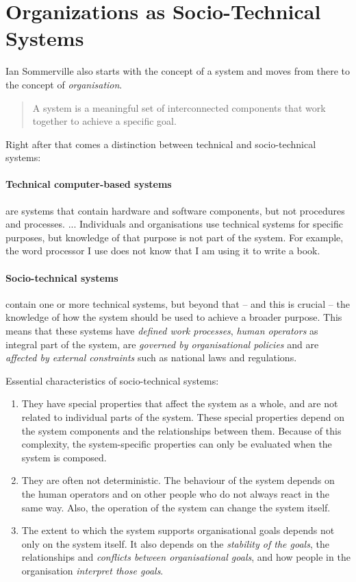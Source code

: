 \documentclass[11pt,a4paper]{article}
\begin{document}
\section{Organizations as Socio-Technical Systems}

Ian Sommerville \cite{Sommerville2015} also starts with the concept of a
system and moves from there to the concept of \emph{organisation}.
\begin{quote}
  A system is a meaningful set of interconnected components that work together
  to achieve a specific goal.  \cite{Sommerville2015}
\end{quote}
Right after that comes a distinction between technical and socio-technical
systems:

\paragraph{Technical computer-based systems}
are systems that contain hardware and software components, but not procedures
and processes. ... Individuals and organisations use technical systems for
specific purposes, but knowledge of that purpose is not part of the system.
For example, the word processor I use does not know that I am using it to
write a book.

\paragraph{Socio-technical systems}
contain one or more technical systems, but beyond that -- and this is crucial
-- the knowledge of how the system should be used to achieve a broader
purpose.  This means that these systems have \emph{defined work processes},
\emph{human operators} as integral part of the system, are \emph{governed by
  organisational policies} and are \emph{affected by external constraints}
such as national laws and regulations.

Essential characteristics of socio-technical systems:
\begin{enumerate}
\item They have special properties that affect the system as a whole, and are
  not related to individual parts of the system. These special properties
  depend on the system components and the relationships between them. Because
  of this complexity, the system-specific properties can only be evaluated
  when the system is composed.
\item They are often not deterministic. The behaviour of the system depends on
  the human operators and on other people who do not always react in the same
  way. Also, the operation of the system can change the system itself.
\item The extent to which the system supports organisational goals depends not
  only on the system itself. It also depends on the \emph{stability of the
    goals}, the relationships and \emph{conflicts between organisational
    goals}, and how people in the organisation \emph{interpret those goals}.
\end{enumerate}
\end{document}
